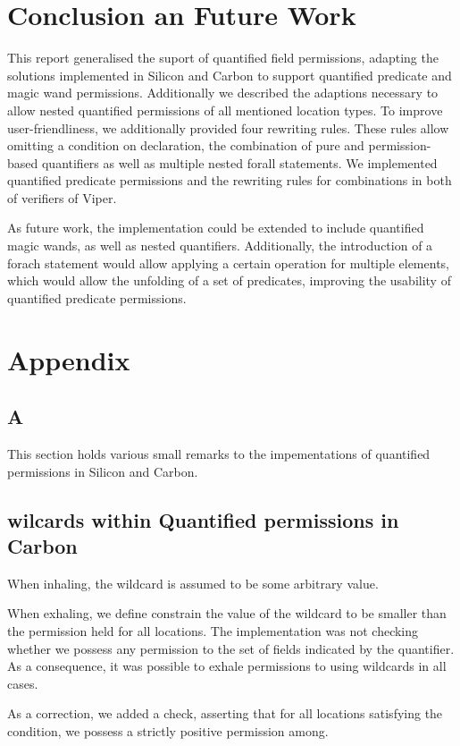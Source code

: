 \documentclass[12pt]{article}
\begin{document}
\section{Conclusion an Future Work}
This report generalised the suport of quantified field permissions, adapting the solutions implemented in Silicon and Carbon to support quantified predicate and magic wand permissions. Additionally we described the adaptions necessary to allow nested quantified permissions of all mentioned location types. To improve user-friendliness, we additionally provided four rewriting rules. These rules allow omitting a condition on declaration, the combination of pure and permission-based quantifiers as well as multiple nested forall statements. We implemented quantified predicate permissions and the rewriting rules for combinations in both of verifiers of Viper.

As future work, the implementation could be extended to include quantified magic wands, as well as nested quantifiers. Additionally, the introduction of a forach statement would allow applying a certain operation for multiple elements, which would allow the unfolding of a set of predicates, improving the usability of quantified predicate permissions.



\newpage
\section{Appendix}
\subsection{A}
This section holds various small remarks to the impementations of quantified permissions in Silicon and Carbon.

\subsection{wilcards within Quantified permissions in Carbon}
When inhaling, the wildcard is assumed to be some arbitrary value. 

When exhaling, we define constrain the value of the wildcard to be smaller than the permission held for all locations. The implementation was not checking whether we possess any permission to the set of fields indicated by the quantifier. As a consequence, it was possible to exhale permissions to using wildcards in all cases.

As a correction, we added a check, asserting that for all locations satisfying the condition, we possess a strictly positive permission among.
\end{document}

